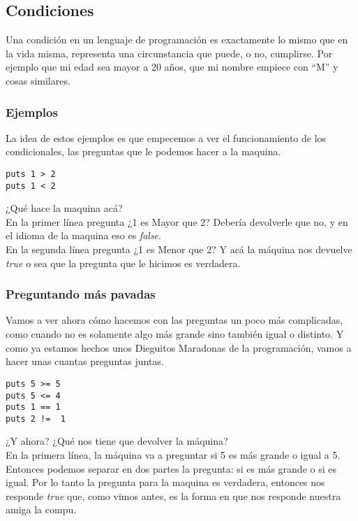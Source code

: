 \subsection{Condiciones}
Una condición en un lenguaje de programación es exactamente lo mismo que en la vida misma, representa una circunstancia que puede, o no, cumplirse. Por ejemplo que mi edad sea mayor a 20 años, que mi nombre empiece con “M” y cosas similares.

\subsubsection{Ejemplos}
La idea de estos ejemplos es que empecemos a ver el funcionamiento de los condicionales, las preguntas que le podemos hacer a la maquina.

\begin{lstlisting}
puts 1 > 2
puts 1 < 2
\end{lstlisting}

¿Qué hace la maquina acá?\\

En la primer línea pregunta ¿1 es Mayor que 2? Debería devolverle que no, y en el idioma de la maquina eso es \emph{false}.\\

En la segunda línea pregunta ¿1 es Menor que 2? Y acá la máquina nos devuelve \emph{true} o sea que la pregunta que le hicimos es verdadera.\\

\subsubsection{Preguntando más pavadas}
Vamos a ver ahora cómo hacemos con las preguntas un poco más complicadas, como cuando no es solamente algo más grande sino también igual o distinto. Y como ya estamos hechos unos Dieguitos Maradonas de la programación, vamos a hacer unas cuantas preguntas juntas.

\begin{lstlisting}
puts 5 >= 5
puts 5 <= 4
puts 1 == 1
puts 2 !=  1
\end{lstlisting}

¿Y ahora? ¿Qué nos tiene que devolver la máquina?\\

En la primera línea, la máquina va a preguntar si 5 es más grande o igual a 5. Entonces podemos separar en dos partes la pregunta: si es más grande o si es igual. Por lo tanto la pregunta para la maquina es verdadera, entonces nos responde \emph{true} que, como vimos antes, es la forma en que nos responde nuestra amiga la compu.\\

